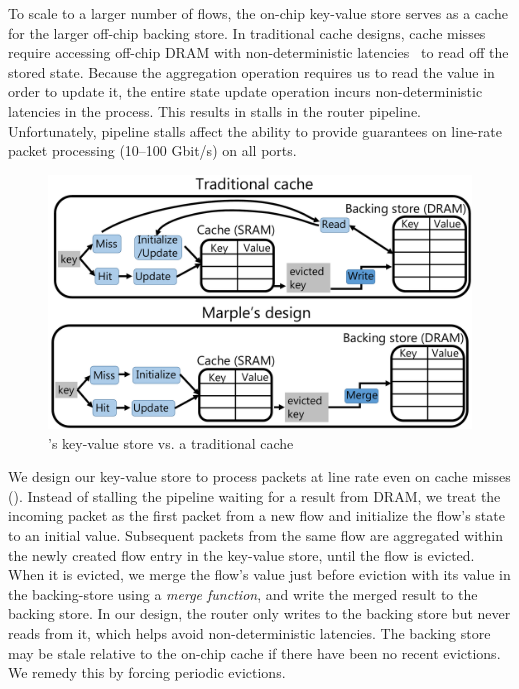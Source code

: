 To scale to a larger number of flows, the on-chip key-value store serves as a
cache for the larger off-chip backing store. In traditional cache designs,
cache misses require accessing off-chip DRAM with non-deterministic
latencies~\cite{unpredictable_cache} to read off the stored state. Because the
aggregation operation requires us to read the value in order to update it, the
entire state update operation incurs non-deterministic latencies in the
process.  This results in stalls in the router pipeline. Unfortunately,
pipeline stalls affect the ability to provide guarantees on line-rate
packet processing (10--100 Gbit/s) on all ports.

\begin{figure}
\includegraphics[width=\columnwidth]{pq_kv_store.pdf}
\caption{\TheSystem's key-value store vs. a traditional cache}
\label{fig:kv}
\end{figure}

We design our key-value store to process packets at line rate even on cache
misses (). Instead of stalling the pipeline waiting for a result from
DRAM, we treat the incoming packet as the first packet from a new flow and
initialize the flow's state to an initial value. Subsequent packets from the
same flow are aggregated within the newly created flow entry in the key-value
store, until the flow is evicted. When it is evicted, we merge the flow's value
just before eviction with its value in the backing-store using a {\em merge
function}, and write the merged result to the backing store. In our design, the
router only writes to the backing store but never reads from it, which helps
avoid non-deterministic latencies.  The backing store may be
stale relative to the on-chip cache if there have been no recent evictions. We
remedy this by forcing periodic evictions.

